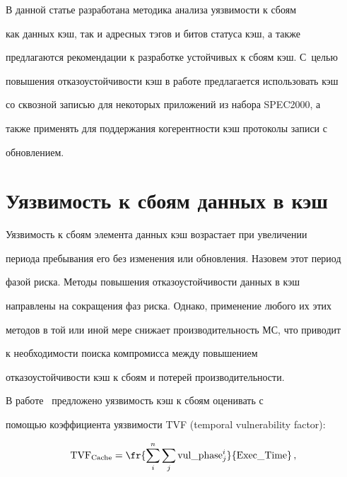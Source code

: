       


      В данной статье разработана методика  анализа уязвимости к сбоям 


как данных кэш,  так  и адресных тэгов и битов статуса кэш,  а также 


предлагаются рекомендации к разработке устойчивых к сбоям кэш. С~целью 


повышения отказоустойчивости кэш в работе предлагается использовать кэш 


со сквозной записью для некоторых приложений из набора SPEC2000, а 


также применять для поддержания когерентности кэш протоколы записи с 


обновлением. 





\section{Уязвимость  к сбоям данных в кэш}





Уязвимость к сбоям элемента данных кэш возрастает при увеличении 


периода пребывания его без изменения или обновления. Назовем этот период 


фазой риска. Методы повышения отказоустойчивости данных в кэш 


направлены на сокращения фаз риска. Однако, применение любого их этих 


методов  в той или иной мере снижает производительность МС, что приводит 


к необходимости поиска компромисса между повышением 


отказоустойчивости кэш к сбоям и потерей производительности.


      


      В работе~\cite{3-5} предложено уязвимость кэш к сбоям оценивать с 


помощью  коэффициента уязвимости TVF (temporal vulnerability factor):


      \begin{equation*}


      \mathrm{TVF}_{\mathrm{Cache}}=\fr{\sum\limits_i^n \sum\limits_j 


\mathrm{vul}\_\mathrm{phase}^i_j}{\mbox{Exec}\_\mbox{Time}}\,,




      \end{equation*}


